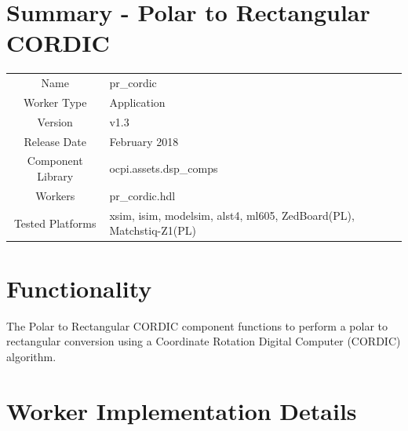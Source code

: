 \documentclass{article}
\author{} %
\date{Version \docVersion} %
\title{\docTitle}
\def\docVersion{1.3}
\def\comp{pr\_cordic}
\def\Comp{Polar to Rectangular CORDIC}
\begin{document}
\section*{Summary - \Comp}
\begin{tabular}{|c|M{13.5cm}|}
	\hline
	                  &                                                              \\
	\hline
	Name              & \comp                                                        \\
	\hline
	Worker Type       & Application                                                  \\
	\hline
	Version           & v\docVersion \\
	\hline
	Release Date      & February 2018 \\
	\hline
	Component Library & ocpi.assets.dsp\_comps                                        \\
	\hline
	Workers           & \comp.hdl                                                    \\
	\hline
	Tested Platforms  & xsim, isim, modelsim, alst4, ml605, ZedBoard(PL), Matchstiq-Z1(PL) \\
	\hline
\end{tabular}

\section*{Functionality}
\begin{flushleft}
	The {\Comp} component functions to perform a polar to rectangular conversion using a Coordinate Rotation Digital Computer (CORDIC) algorithm.
\end{flushleft}

\section*{Worker Implementation Details}
\end{document}
